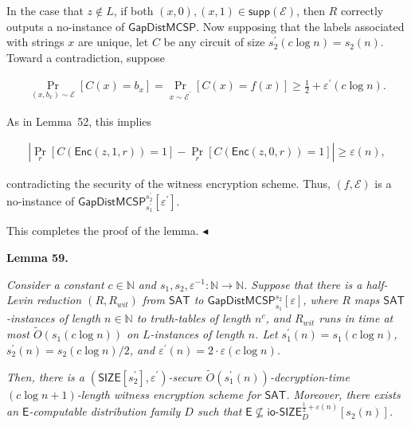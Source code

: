 \documentclass[10pt,a4paper]{article}
\begin{document}
In the case that $z\notin L$, if both $(x,0),(x,1)\in{\mathsf{supp}}(\mathcal{E})$, then $R$ correctly outputs a no-instance of ${\mathsf{GapDistMCSP}}$. Now supposing that the labels associated with strings $x$ are unique, let $C$ be any circuit of size $s_{2}^{\prime}(c\log n)=s_{2}(n)$. Toward a contradiction, suppose\par


\[\begin{gathered}
\Pr_{(x,b_{x})\sim\mathcal{E}}[C(x)=b_{x}]=\Pr_{x\sim\mathcal{E^{\prime}}}[C(x)=f(x)]\geq\frac{1}{2}+\varepsilon^{\prime}(c\log n).
\end{gathered}\]


As in Lemma 52, this implies\par


\[\begin{gathered}
\left|\Pr_{r}[C({\mathsf{Enc}}(z,1,r))=1]-\Pr_{r}[C({\mathsf{Enc}}(z,0,r))=1]\right|\geq\varepsilon(n),
\end{gathered}\]


contradicting the security of the witness encryption scheme. Thus, $(f,\mathcal{E})$ is a no-instance of ${\mathsf{GapDistMCSP}}_{s_{1}^{\prime}}^{s_{2}^{\prime}}[\varepsilon^{\prime}]$.\par




This completes the proof of the lemma.
$\blacktriangleleft$\par





\par\medskip\noindent\textbf{
\textbf{Lemma 59}\textbf{.}
}\par



\emph{Consider a constant $c\in\mathbb{N}$ and $s_{1},s_{2},\varepsilon^{-1}:\mathbb{N}\to\mathbb{N}$. Suppose that there is a half-Levin reduction $(R,R_{wit})$ from ${\mathsf{SAT}}$ to ${\mathsf{GapDistMCSP}}_{s_{1}}^{s_{2}}[\varepsilon]$, where $R$ maps ${\mathsf{SAT}}$-instances of length $n\in\mathbb{N}$ to truth-tables of length $n^{c}$, and $R_{wit}$ runs in time at most $\widetilde{O}(s_{1}(c\log n))$ on $L$-instances of length $n$. Let $s_{1}^{\prime}(n)=s_{1}(c\log n)$, $s_{2}^{\prime}(n)=s_{2}(c\log n)/2$, and $\varepsilon^{\prime}(n)=2\cdot\varepsilon(c\log n)$.}\par




\emph{Then, there is a $({\mathsf{SIZE}}[s_{2}^{\prime}],\varepsilon^{\prime})$-secure $\widetilde{O}(s_{1}^{\prime}(n))$-decryption-time $(c\log n+1)$-length witness encryption scheme for ${\mathsf{SAT}}$. Moreover, there exists an ${\mathsf{E}}$-computable distribution family $D$ such that ${\mathsf{E}}\nsubseteq{\mathsf{io\text{-}}}{\mathsf{SIZE}}_{D}^{\frac{1}{2}+\varepsilon(n)}[s_{2}(n)]$.}\par
\end{document}
